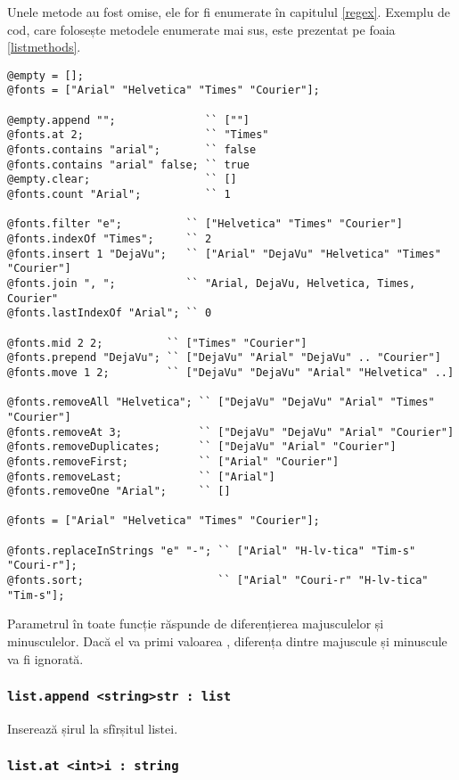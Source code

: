 Unele metode au fost omise, ele for fi enumerate în capitulul \ref{regex}. Exemplu de cod, care folosește metodele enumerate mai sus, este prezentat pe foaia \ref{listmethods}. 

\begin{lstlisting}[caption=Metodele clasei list, label=listmethods]
@empty = [];
@fonts = ["Arial" "Helvetica" "Times" "Courier"];

@empty.append "";              `` [""]
@fonts.at 2;                   `` "Times"
@fonts.contains "arial";       `` false
@fonts.contains "arial" false; `` true
@empty.clear;                  `` []
@fonts.count "Arial";          `` 1

@fonts.filter "e";          `` ["Helvetica" "Times" "Courier"]
@fonts.indexOf "Times";     `` 2
@fonts.insert 1 "DejaVu";   `` ["Arial" "DejaVu" "Helvetica" "Times" "Courier"]
@fonts.join ", ";           `` "Arial, DejaVu, Helvetica, Times, Courier"
@fonts.lastIndexOf "Arial"; `` 0

@fonts.mid 2 2;          `` ["Times" "Courier"]
@fonts.prepend "DejaVu"; `` ["DejaVu" "Arial" "DejaVu" .. "Courier"]
@fonts.move 1 2;         `` ["DejaVu" "DejaVu" "Arial" "Helvetica" ..]

@fonts.removeAll "Helvetica"; `` ["DejaVu" "DejaVu" "Arial" "Times" "Courier"]
@fonts.removeAt 3;            `` ["DejaVu" "DejaVu" "Arial" "Courier"]
@fonts.removeDuplicates;      `` ["DejaVu" "Arial" "Courier"]
@fonts.removeFirst;           `` ["Arial" "Courier"]
@fonts.removeLast;            `` ["Arial"]
@fonts.removeOne "Arial";     `` []

@fonts = ["Arial" "Helvetica" "Times" "Courier"];

@fonts.replaceInStrings "e" "-"; `` ["Arial" "H-lv-tica" "Tim-s" "Couri-r"];
@fonts.sort;                     `` ["Arial" "Couri-r" "H-lv-tica" "Tim-s"];
\end{lstlisting}

Parametrul  în toate funcție răspunde de diferențierea majusculelor și minusculelor. Dacă el va primi valoarea \false, diferența dintre majuscule și minuscule va fi ignorată.

\subsubsection{\lstinline|list.append <string>str : list|}

Inserează șirul  la sfîrșitul listei.

\subsubsection{\lstinline|list.at <int>i : string|}

